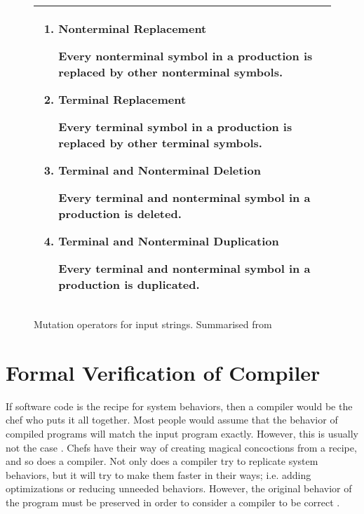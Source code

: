 \begin{figure}[!htb]
    \begin{tabular}{|L{0.95\textwidth}|}
        \hline
        \begin{enumerate}
            \item \textbf{Nonterminal Replacement}
            
            Every nonterminal symbol in a production is replaced by other nonterminal symbols.
    
            \item \textbf{Terminal Replacement}
            
            Every terminal symbol in a production is replaced by other terminal symbols.
    
            \item \textbf{Terminal and Nonterminal Deletion}
            
            Every terminal and nonterminal symbol in a production is deleted.
    
            \item \textbf{Terminal and Nonterminal Duplication}
            
            Every terminal and nonterminal symbol in a production is duplicated.
        \end{enumerate} \\
        \hline
    \end{tabular}

    \caption{Mutation operators for input strings. Summarised from \cite[Sec. 6.2]{offutt_mutation_2006}}
    \label{fig:MutationOperators}
\end{figure}

\section{Formal Verification of Compiler}
\label{sec:verification}

If software code is the recipe for system behaviors, then a compiler would be the chef who puts it all together. Most people would assume that 
the behavior of compiled programs will match the input program exactly. However, this is usually not the case \cite{compcertVerification}. 
Chefs have their way of creating magical concoctions from a recipe, and so does a compiler. Not only does a compiler try to replicate 
system behaviors, but it will try to make them faster in their ways; i.e. adding optimizations or reducing unneeded behaviors. However, the 
original behavior of the program must be preserved in order to consider a compiler to be correct 
\cite{compcertVerification,AliveInLean,Alive2,Term_Graph_Optimizations}.

